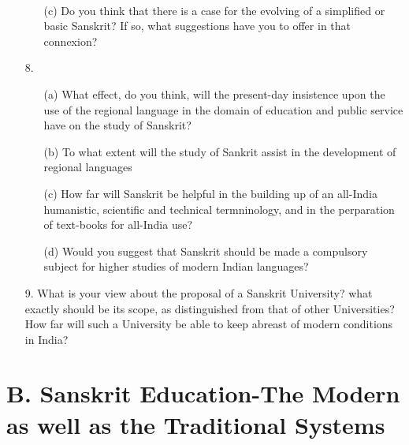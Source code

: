 {\rm 
\begin{itemize} 
\item[~]
\begin{itemize}
\item[(c)]  Do you think that there is a case for the evolving of a simplified or basic Sanskrit? If so, what suggestions have you to offer in that connexion?
            \end{itemize}

 \item[8.] \begin{itemize}
           \item[(a)] What effect, do you think, will the present-day insistence upon the use of the regional language in the domain of education and public service have on the study of Sanskrit? 
            
          \item[(b)] To what extent will the study of Sankrit assist in the development of regional languages %

         \item[(c)] How far will Sanskrit be helpful in the building up of an all-India humanistic, scientific and technical termninology, and in the perparation of text-books for all-India use?
            
        \item[(d)] Would you suggest that Sanskrit should be made a compulsory subject for higher studies of modern Indian languages?
       \end{itemize}   
             
\item[9.] What is your view about the proposal of a Sanskrit University? what exactly should be its scope, as distinguished from that of other Universities?  How far will such a University be able to keep abreast of modern conditions in India?                      
\end{itemize}
}


{\section*{{\rm B. Sanskrit Education-The Modern as well as the Traditional Systems}}}

